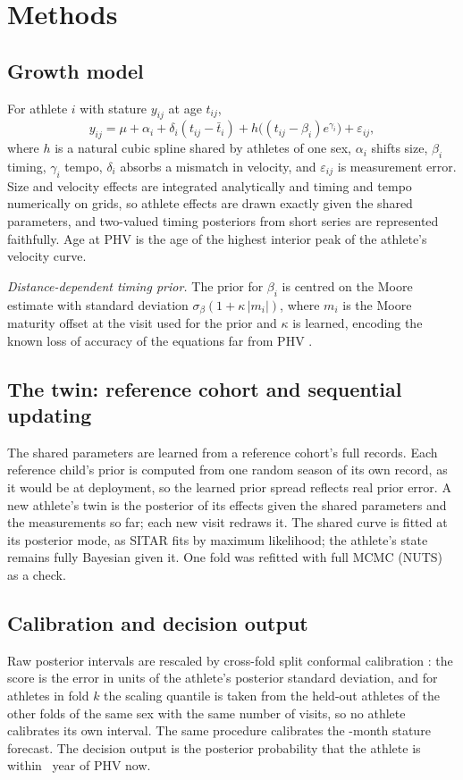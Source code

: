 \documentclass[journal]{IEEEtran}
\begin{document}
\section{Methods}

\subsection{Growth model}
For athlete $i$ with stature $y_{ij}$ at age $t_{ij}$,
\begin{equation}
y_{ij} = \mu + \alpha_i + \delta_i (t_{ij}-\bar t_i) + h\big((t_{ij}-\beta_i)e^{\gamma_i}\big) + \varepsilon_{ij},
\end{equation}
where $h$ is a natural cubic spline shared by athletes of one sex, $\alpha_i$ shifts size,
$\beta_i$ timing, $\gamma_i$ tempo, $\delta_i$ absorbs a mismatch in velocity, and
$\varepsilon_{ij}$ is measurement error. Size and velocity effects are integrated analytically and
timing and tempo numerically on grids, so athlete effects are drawn exactly given the shared
parameters, and two-valued timing posteriors from short series are represented faithfully. Age at
PHV is the age of the highest interior peak of the athlete's velocity curve.

\emph{Distance-dependent timing prior.} The prior for $\beta_i$ is centred on the Moore estimate
\cite{moore2015} with standard deviation $\sigma_\beta(1+\kappa\,|m_i|)$, where $m_i$ is the Moore
maturity offset at the visit used for the prior and $\kappa$ is learned, encoding the known loss of
accuracy of the equations far from PHV \cite{koziel2018modified}.

\subsection{The twin: reference cohort and sequential updating}
The shared parameters are learned from a reference cohort's full records. Each reference child's
prior is computed from one random season of its own record, as it would be at deployment, so the
learned prior spread reflects real prior error. A new athlete's twin is the posterior of its
effects given the shared parameters and the measurements so far; each new visit redraws it. The
shared curve is fitted at its posterior mode, as SITAR fits by maximum likelihood; the athlete's
state remains fully Bayesian given it. One fold was refitted with full MCMC (NUTS) as a check.

\subsection{Calibration and decision output}
Raw posterior intervals are rescaled by cross-fold split conformal calibration
\cite{lei2018conformal,angelopoulos2021gentle}: the score is the error in units of the athlete's
posterior standard deviation, and for athletes in fold $k$ the scaling quantile is taken from the
held-out athletes of the other folds of the same sex with the same number of visits, so no athlete
calibrates its own interval. The same procedure calibrates the \SpecHorizon{}-month stature
forecast. The decision output is the posterior probability that the athlete is within
\SpecCircaWidth{}~year of PHV now.
\end{document}
